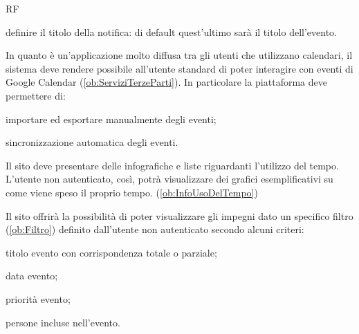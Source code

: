 \begin{listaPersonale}{RF}
\begin{listaPersonale2}[RF]{}
		 definire il titolo della notifica: di default quest'ultimo sarà il titolo dell'evento.
	\end{listaPersonale2}

	 In quanto è un'applicazione molto diffusa tra gli utenti che utilizzano calendari, il sistema deve rendere possibile all'utente standard di poter interagire con eventi di Google Calendar (\ref{ob:ServiziTerzeParti}). In particolare la piattaforma deve permettere di:
	\begin{listaPersonale2}[RF]{}
		 importare ed esportare manualmente degli eventi;

		 sincronizzazione automatica degli eventi.
	\end{listaPersonale2}

	 Il sito deve presentare delle infografiche e liste riguardanti l'utilizzo del tempo. L'utente non autenticato, così, potrà visualizzare dei grafici esemplificativi su come viene speso il proprio tempo. (\ref{ob:InfoUsoDelTempo})

	 Il sito offrirà la possibilità di poter visualizzare gli impegni dato un specifico filtro (\ref{ob:Filtro}) definito dall'utente non autenticato secondo alcuni criteri:
	\begin{listaPersonale2}[RF]{}
		 titolo evento con corrispondenza totale o parziale;

		 data evento;

		 priorità evento;

		 persone incluse nell'evento.
	\end{listaPersonale2}


\end{listaPersonale}
